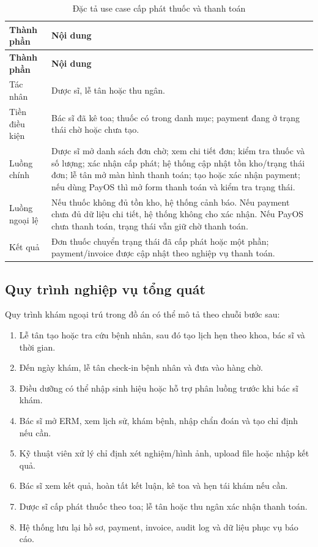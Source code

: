 \documentclass[12pt,a4paper]{article}
\numberwithin{figure}{subsection}
\numberwithin{table}{subsection}
\begin{document}
\begin{longtable}{|p{3.4cm}|p{10.4cm}|}
\caption{Đặc tả use case cấp phát thuốc và thanh toán} \\
\hline
\textbf{Thành phần} & \textbf{Nội dung} \\
\hline
\endfirsthead
\hline
\textbf{Thành phần} & \textbf{Nội dung} \\
\hline
\endhead
Tác nhân & Dược sĩ, lễ tân hoặc thu ngân. \\
\hline
Tiền điều kiện & Bác sĩ đã kê toa; thuốc có trong danh mục; payment đang ở trạng thái chờ hoặc chưa tạo. \\
\hline
Luồng chính & Dược sĩ mở danh sách đơn chờ; xem chi tiết đơn; kiểm tra thuốc và số lượng; xác nhận cấp phát; hệ thống cập nhật tồn kho/trạng thái đơn; lễ tân mở màn hình thanh toán; tạo hoặc xác nhận payment; nếu dùng PayOS thì mở form thanh toán và kiểm tra trạng thái. \\
\hline
Luồng ngoại lệ & Nếu thuốc không đủ tồn kho, hệ thống cảnh báo. Nếu payment chưa đủ dữ liệu chi tiết, hệ thống không cho xác nhận. Nếu PayOS chưa thanh toán, trạng thái vẫn giữ chờ thanh toán. \\
\hline
Kết quả & Đơn thuốc chuyển trạng thái đã cấp phát hoặc một phần; payment/invoice được cập nhật theo nghiệp vụ thanh toán. \\
\hline
\end{longtable}

\subsection{Quy trình nghiệp vụ tổng quát}

Quy trình khám ngoại trú trong đồ án có thể mô tả theo chuỗi bước sau:

\begin{enumerate}
    \item Lễ tân tạo hoặc tra cứu bệnh nhân, sau đó tạo lịch hẹn theo khoa, bác sĩ và thời gian.
    \item Đến ngày khám, lễ tân check-in bệnh nhân và đưa vào hàng chờ.
    \item Điều dưỡng có thể nhập sinh hiệu hoặc hỗ trợ phân luồng trước khi bác sĩ khám.
    \item Bác sĩ mở ERM, xem lịch sử, khám bệnh, nhập chẩn đoán và tạo chỉ định nếu cần.
    \item Kỹ thuật viên xử lý chỉ định xét nghiệm/hình ảnh, upload file hoặc nhập kết quả.
    \item Bác sĩ xem kết quả, hoàn tất kết luận, kê toa và hẹn tái khám nếu cần.
    \item Dược sĩ cấp phát thuốc theo toa; lễ tân hoặc thu ngân xác nhận thanh toán.
    \item Hệ thống lưu lại hồ sơ, payment, invoice, audit log và dữ liệu phục vụ báo cáo.
\end{enumerate}
\end{document}
